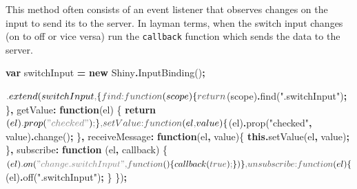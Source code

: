 \documentclass[
]{krantz}
\makeatletter
\newenvironment{Shaded}{\begin{snugshade}}{\end{snugshade}}
\newcommand{\ControlFlowTok}[1]{\textcolor[rgb]{0.27,0.27,0.27}{\textbf{#1}}}
\newcommand{\DataTypeTok}[1]{\textcolor[rgb]{0.27,0.27,0.27}{#1}}
\newcommand{\FunctionTok}[1]{\textcolor[rgb]{0,0,0}{#1}}
\newcommand{\KeywordTok}[1]{\textcolor[rgb]{0.27,0.27,0.27}{\textbf{#1}}}
\newcommand{\NormalTok}[1]{#1}
\newcommand{\OperatorTok}[1]{\textcolor[rgb]{0.43,0.43,0.43}{\textbf{#1}}}
\newcommand{\StringTok}[1]{\textcolor[rgb]{0.5,0.5,0.5}{#1}}
\newenvironment{kframe}{%
\medskip{}
\setlength{\fboxsep}{.8em}
 \def\at@end@of@kframe{}%
 \ifinner\ifhmode%
  \def\at@end@of@kframe{\end{minipage}}%
  \begin{minipage}{\columnwidth}%
 \fi\fi%
 \def\FrameCommand##1{\hskip\@totalleftmargin \hskip-\fboxsep
 \colorbox{shadecolor}{##1}\hskip-\fboxsep
     \hskip-\linewidth \hskip-\@totalleftmargin \hskip\columnwidth}%
 \MakeFramed {\advance\hsize-\width
   \@totalleftmargin\z@ \linewidth\hsize
   \@setminipage}}%
 {\par\unskip\endMakeFramed%
 \at@end@of@kframe}
\renewenvironment{Shaded}{\begin{kframe}}{\end{kframe}}
\makeatother
\begin{document}
This method often consists of an event listener that observes changes on the input to send its to the server. In layman terms, when the switch input changes (on to off or vice versa) run the \texttt{callback} function which sends the data to the server.

\begin{Shaded}
\begin{Highlighting}[]
\KeywordTok{var}\NormalTok{ switchInput }\OperatorTok{=} \KeywordTok{new}\NormalTok{ Shiny}\OperatorTok{.}\FunctionTok{InputBinding}\NormalTok{()}\OperatorTok{;}

\NormalTok{$}\OperatorTok{.}\FunctionTok{extend}\NormalTok{(switchInput}\OperatorTok{,}\NormalTok{ \{}
  \DataTypeTok{find}\OperatorTok{:} \KeywordTok{function}\NormalTok{(scope) \{}
    \ControlFlowTok{return}\NormalTok{ $(scope)}\OperatorTok{.}\FunctionTok{find}\NormalTok{(}\StringTok{".switchInput"}\NormalTok{)}\OperatorTok{;}
\NormalTok{  \}}\OperatorTok{,}
  \DataTypeTok{getValue}\OperatorTok{:} \KeywordTok{function}\NormalTok{(el) \{}
    \ControlFlowTok{return}\NormalTok{ $(el)}\OperatorTok{.}\FunctionTok{prop}\NormalTok{(}\StringTok{"checked"}\NormalTok{)}\OperatorTok{;}
\NormalTok{  \}}\OperatorTok{,}
  \DataTypeTok{setValue}\OperatorTok{:} \KeywordTok{function}\NormalTok{(el}\OperatorTok{,}\NormalTok{ value) \{}
\NormalTok{    $(el)}\OperatorTok{.}\FunctionTok{prop}\NormalTok{(}\StringTok{"checked"}\OperatorTok{,}\NormalTok{ value)}\OperatorTok{.}\FunctionTok{change}\NormalTok{()}\OperatorTok{;}
\NormalTok{  \}}\OperatorTok{,}
  \DataTypeTok{receiveMessage}\OperatorTok{:} \KeywordTok{function}\NormalTok{(el}\OperatorTok{,}\NormalTok{ value)\{}
    \KeywordTok{this}\OperatorTok{.}\FunctionTok{setValue}\NormalTok{(el}\OperatorTok{,}\NormalTok{ value)}\OperatorTok{;}
\NormalTok{  \}}\OperatorTok{,}
  \DataTypeTok{subscribe}\OperatorTok{:} \KeywordTok{function}\NormalTok{ (el}\OperatorTok{,}\NormalTok{ callback) \{}
\NormalTok{    $(el)}\OperatorTok{.}\FunctionTok{on}\NormalTok{(}\StringTok{"change.switchInput"}\OperatorTok{,} \KeywordTok{function}\NormalTok{()\{}
\NormalTok{      callback(}\KeywordTok{true}\NormalTok{)}\OperatorTok{;}
\NormalTok{    \})}
\NormalTok{  \}}\OperatorTok{,}
  \DataTypeTok{unsubscribe}\OperatorTok{:} \KeywordTok{function}\NormalTok{(el) \{}
\NormalTok{    $(el)}\OperatorTok{.}\FunctionTok{off}\NormalTok{(}\StringTok{".switchInput"}\NormalTok{)}\OperatorTok{;}
\NormalTok{  \}}
\NormalTok{\})}\OperatorTok{;}
\end{Highlighting}
\end{Shaded}
\end{document}
